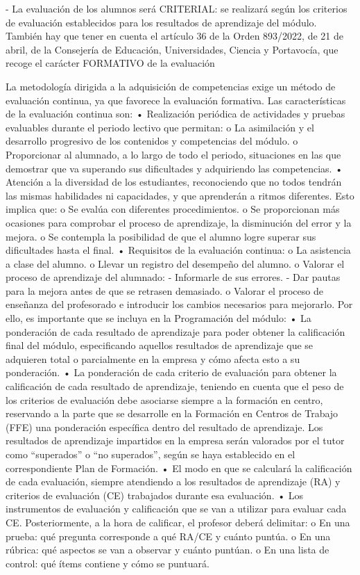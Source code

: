 
- La evaluación de los alumnos será CRITERIAL: se realizará según los criterios de evaluación establecidos para los resultados de aprendizaje del módulo.
También hay que tener en cuenta el artículo 36 de la Orden 893/2022, de 21 de abril, de la Consejería de Educación, Universidades, Ciencia y Portavocía, que recoge el carácter FORMATIVO de la evaluación

La metodología dirigida a la adquisición de competencias exige un método de evaluación continua, ya que favorece la evaluación formativa. Las características de la evaluación continua son:
•	Realización periódica de actividades y pruebas evaluables durante el periodo lectivo que permitan:
o	La asimilación y el desarrollo progresivo de los contenidos y competencias del módulo.
o	Proporcionar al alumnado, a lo largo de todo el periodo, situaciones en las que demostrar que va superando sus dificultades y adquiriendo las competencias.
•	Atención a la diversidad de los estudiantes, reconociendo que no todos tendrán las mismas habilidades ni capacidades, y que aprenderán a ritmos diferentes. Esto implica que:
o	Se evalúa con diferentes procedimientos.
o	Se proporcionan más ocasiones para comprobar el proceso de aprendizaje, la disminución del error y la mejora.
o	Se contempla la posibilidad de que el alumno logre superar sus dificultades hasta el final.
•	Requisitos de la evaluación continua:
o	La asistencia a clase del alumno.
o	Llevar un registro del desempeño del alumno.
o	Valorar el proceso de aprendizaje del alumnado: 
- 	Informarle de sus errores.
-	Dar pautas para la mejora antes de que se retrasen demasiado.
o	Valorar el proceso de enseñanza del profesorado e introducir los cambios necesarios para mejorarlo.
Por ello, es importante que se incluya en la Programación del módulo:
•	La ponderación de cada resultado de aprendizaje para poder obtener la calificación final del módulo, especificando aquellos resultados de aprendizaje que se adquieren total o parcialmente en la empresa y cómo afecta esto a su ponderación.
•	La ponderación de cada criterio de evaluación para obtener la calificación de cada resultado de aprendizaje, teniendo en cuenta que el peso de los criterios de evaluación debe asociarse siempre a la formación en centro, reservando a la parte que se desarrolle en la Formación en Centros de Trabajo (FFE) una ponderación específica dentro del resultado de aprendizaje. Los resultados de aprendizaje impartidos en la empresa serán valorados por el tutor como “superados” o “no superados”, según se haya establecido en el correspondiente Plan de Formación.
•	El modo en que se calculará la calificación de cada evaluación, siempre atendiendo a los resultados de aprendizaje (RA) y criterios de evaluación (CE) trabajados durante esa evaluación.
•	Los instrumentos de evaluación y calificación que se van a utilizar para evaluar cada CE. Posteriormente, a la hora de calificar, el profesor deberá delimitar: 
o	En una prueba: qué pregunta corresponde a qué RA/CE y cuánto puntúa.
o	En una rúbrica: qué aspectos se van a observar y cuánto puntúan.
o	En una lista de control: qué ítems contiene y cómo se puntuará.


